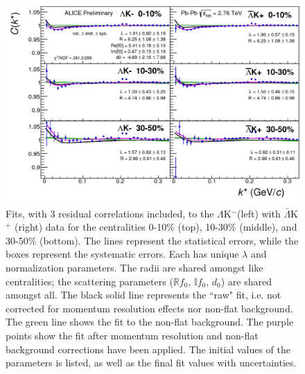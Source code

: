 \documentclass[../AnalysisNoteJBuxton.tex]{subfiles}
\begin{document}
\begin{figure}[h]
  \centering
  \includegraphics[width=\textwidth]{7_ResultsAndDiscussion/Figures/canKStarCfwFitsLamKchMwConj_0010_1030_3050_MomResCrctn_NonFlatBgdCrctn_3Res_PrimMaxDecay4fm_UsingXiDataAndCoulombOnly.pdf}
  \caption[$\Lambda$K$^{-}$($\bar{\Lambda}$K$^{+}$) Fits with 3 Residuals]{Fits, with 3 residual correlations included, to the $\Lambda$K$^{-}$(left) with $\bar{\Lambda}$K$^{+}$ (right) data for the centralities 0-10\% (top), 10-30\% (middle), and 30-50\% (bottom).
The lines represent the statistical errors, while the boxes represent the systematic errors.  
Each has unique $\lambda$ and normalization parameters.
The radii are shared amongst like centralities; the scattering parameters ($\mathbb{R}f_{0}$, $\mathbb{I}f_{0}$, $d_{0}$) are shared amongst all.
The black solid line represents the ``raw" fit, i.e. not corrected for momentum resolution effects nor non-flat background.  
The green line shows the fit to the non-flat background.
The purple points show the fit after momentum resolution and non-flat background corrections have been applied.
The initial values of the parameters is listed, as well as the final fit values with uncertainties.}
  \label{fig:LamKchMwConjFits_3Res}
\end{figure}
\end{document}
